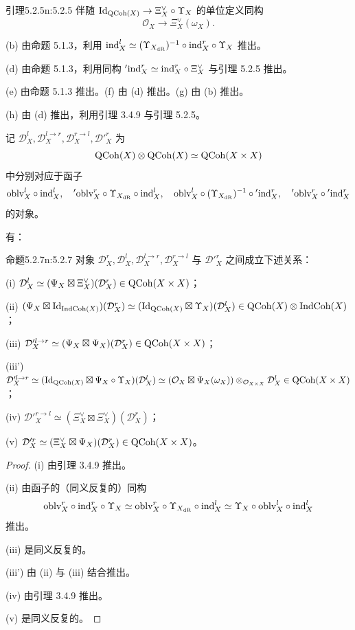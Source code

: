 \begin{othm}{引理}{5.2.5}{n:5.2.5}
伴随 $\mathrm{Id}_{\mathrm{QCoh}(X)}\to\Xi^{\vee}_X\circ\Upsilon_X$ 的单位定义同构
\[
\mathcal{O}_X\to\Xi^{\vee}_X(\omega_X).
\]
\end{othm}

(b) 由命题 5.1.3，利用 $\mathrm{ind}^l_X\simeq(\Upsilon_{X_{\mathrm{dR}}})^{-1}\circ\mathrm{ind}^r_X\circ\Upsilon_X$ 推出。

(d) 由命题 5.1.3，利用同构 ${}'\mathrm{ind}^r_X\simeq\mathrm{ind}^r_X\circ\Xi^{\vee}_X$ 与引理 5.2.5 推出。

(e) 由命题 5.1.3 推出。(f) 由 (d) 推出。(g) 由 (b) 推出。

(h) 由 (d) 推出，利用引理 3.4.9 与引理 5.2.5。

记 $\mathcal{D}^l_X,\mathcal{D}^{l\to r}_X,\mathcal{D}^{r\to l}_X,\mathcal{D}'^r_X$ 为
\[
\mathrm{QCoh}(X)\otimes\mathrm{QCoh}(X)\simeq\mathrm{QCoh}(X\times X)
\]
中分别对应于函子
\[
\mathrm{oblv}^l_X\circ\mathrm{ind}^l_X,\quad {}'\mathrm{oblv}^r_X\circ\Upsilon_{X_{\mathrm{dR}}}\circ\mathrm{ind}^l_X,\quad \mathrm{oblv}^l_X\circ(\Upsilon_{X_{\mathrm{dR}}})^{-1}\circ{}'\mathrm{ind}^r_X,\quad {}'\mathrm{oblv}^r_X\circ{}'\mathrm{ind}^r_X
\]
的对象。

有：

\begin{othm}{命题}{5.2.7}{n:5.2.7}
对象 $\mathcal{D}^r_X,\mathcal{D}^l_X,\mathcal{D}^{l\to r}_X,\mathcal{D}^{r\to l}_X$ 与 $\mathcal{D}'^r_X$ 之间成立下述关系：

(i) $\mathcal{D}^l_X\simeq(\Psi_X\boxtimes\Xi^{\vee}_X)(\mathcal{D}^r_X)\in\mathrm{QCoh}(X\times X)$；

(ii) $(\Psi_X\boxtimes\mathrm{Id}_{\mathrm{IndCoh}(X)})(\mathcal{D}^r_X)\simeq(\mathrm{Id}_{\mathrm{QCoh}(X)}\boxtimes\Upsilon_X)(\mathcal{D}^l_X)\in\mathrm{QCoh}(X)\otimes\mathrm{IndCoh}(X)$；

(iii) $\mathcal{D}'^{l\to r}_X\simeq(\Psi_X\boxtimes\Psi_X)(\mathcal{D}^r_X)\in\mathrm{QCoh}(X\times X)$；

(iii') $\mathcal{D}'^{l\to r}_X\simeq(\mathrm{Id}_{\mathrm{QCoh}(X)}\boxtimes\Psi_X\circ\Upsilon_X)(\mathcal{D}^l_X)\simeq(\mathcal{O}_X\boxtimes\Psi_X(\omega_X))\otimes_{\mathcal{O}_{X\times X}}\mathcal{D}^l_X\in\mathrm{QCoh}(X\times X)$；

(iv) $\mathcal{D}'^{r\to l}_X\simeq(\Xi^{\vee}_X\boxtimes\Xi^{\vee}_X)(\mathcal{D}^r_X)$；

(v) $\mathcal{D}'^r_X\simeq(\Xi^{\vee}_X\boxtimes\Psi_X)(\mathcal{D}^r_X)\in\mathrm{QCoh}(X\times X)$。
\end{othm}

\begin{proof}
(i) 由引理 3.4.9 推出。

(ii) 由函子的（同义反复的）同构
\[
\mathrm{oblv}^r_X\circ\mathrm{ind}^r_X\circ\Upsilon_X\simeq\mathrm{oblv}^r_X\circ\Upsilon_{X_{\mathrm{dR}}}\circ\mathrm{ind}^l_X\simeq\Upsilon_X\circ\mathrm{oblv}^l_X\circ\mathrm{ind}^l_X
\]
推出。

(iii) 是同义反复的。

(iii') 由 (ii) 与 (iii) 结合推出。

(iv) 由引理 3.4.9 推出。

(v) 是同义反复的。
\end{proof}

